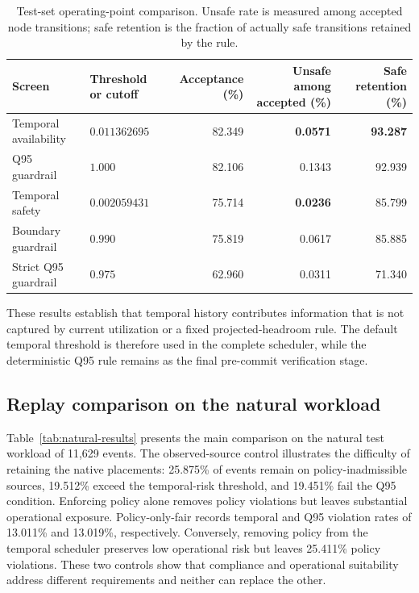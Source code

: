 \begin{table}[t]
\centering
\caption{Test-set operating-point comparison. Unsafe rate is measured
among accepted node transitions; safe retention is the fraction of
actually safe transitions retained by the rule.}
\label{tab:operating-points}
\begin{tabular}{llrrr}
\toprule
Screen &
Threshold or cutoff &
Acceptance (\%) &
Unsafe among accepted (\%) &
Safe retention (\%) \\
\midrule
Temporal availability &
$0.011362695$ &
82.349 &
\textbf{0.0571} &
\textbf{93.287} \\

Q95 guardrail &
$1.000$ &
82.106 &
0.1343 &
92.939 \\

Temporal safety &
$0.002059431$ &
75.714 &
\textbf{0.0236} &
85.799 \\

Boundary guardrail &
$0.990$ &
75.819 &
0.0617 &
85.885 \\

Strict Q95 guardrail &
$0.975$ &
62.960 &
0.0311 &
71.340 \\
\bottomrule
\end{tabular}
\end{table}

These results establish that temporal history contributes information
that is not captured by current utilization or a fixed projected-headroom
rule. The default temporal threshold is therefore used in the complete
scheduler, while the deterministic Q95 rule remains as the final
pre-commit verification stage.

\subsection{Replay comparison on the natural workload}

Table~\ref{tab:natural-results} presents the main comparison on the
natural test workload of 11,629 events. The observed-source control
illustrates the difficulty of retaining the native placements: 25.875\%
of events remain on policy-inadmissible sources, 19.512\% exceed the
temporal-risk threshold, and 19.451\% fail the Q95 condition. Enforcing policy alone removes policy violations but leaves substantial
operational exposure. Policy-only-fair records temporal and Q95
violation rates of 13.011\% and 13.019\%, respectively. Conversely,
removing policy from the temporal scheduler preserves low operational
risk but leaves 25.411\% policy violations. These two controls show that
compliance and operational suitability address different requirements
and neither can replace the other.

